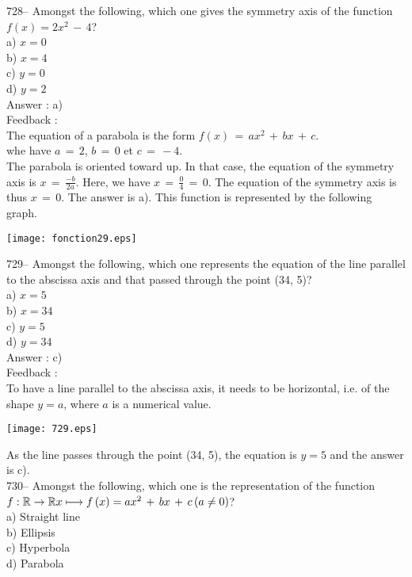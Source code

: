 \documentclass[letterpaper, 12pt]{article}
\begin{document}
728-- Amongst the following, which one gives the symmetry axis of the function $f(x)= 2x^{2}\,-\,4$?\\
a) $x=0$\\
b) $x=4$\\
c) $y=0$\\
d) $y=2$\\

Answer : a)\\

Feedback : \\
The equation of a parabola is the form
$f(x)\,=\,ax^2\,+\,bx\,+\,c$.\\whe have $a\,=\,2$,
$b\,=\,0$ et $c\,=\,-4$.\\
The parabola is oriented toward up. In that case, the equation of the symmetry axis is $x\,=\, \frac{-b}{2a}$. Here, we have $x\,=\,\frac{0}{4}\,=\,0$. The equation of the symmetry axis is thus $x\,=\,0$. The answer is a).
This function is represented by the following graph.\\
    \begin{center}
    \texttt{[image: fonction29.eps]}
    \end{center}


729-- Amongst the following, which one represents the equation of the line parallel to the abscissa axis and that passed through the point (34, 5)?\\
a) $x=5$\\
b) $x=34$\\
c) $y=5$\\
d) $y=34$\\

Answer : c)\\

Feedback : \\
To have a line parallel to the abscissa axis, it needs to be horizontal, i.e. of the shape $y=a$, where $a$
is a numerical value.   \begin{center}
    \texttt{[image: 729.eps]}
    \end{center}
     As the line passes through the point (34, 5), the equation is $y=5$ and the answer is c).\\


730-- Amongst the following, which one is the representation of the function \\
$f :\mathbb{R}\rightarrow\mathbb{R}\\
x\longmapsto f\left( x\right) =ax^{2}\,+\,bx\,+\,c \left( a\neq 0
\right)$?\\
a) Straight line\\
b) Ellipsis \\
c) Hyperbola\\
d) Parabola \\
\end{document}
